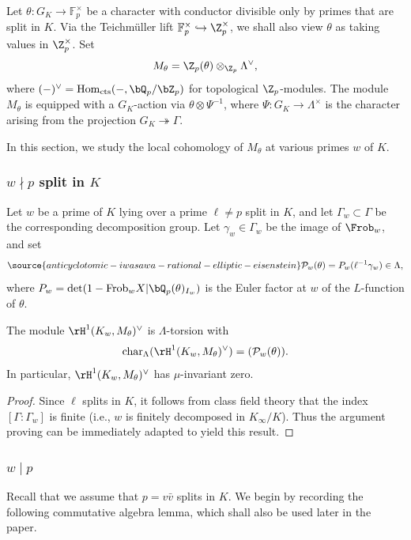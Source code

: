 Let  $\theta:G_K\rightarrow\mathbb{F}_p^\times$
be a character with conductor divisible only by primes that are split in $K$. Via the Teichm\"uller lift $\mathbb{F}_p^\times\hookrightarrow\Z_p^\times$, we shall also view $\theta$ as taking values in $\Z_p^\times$. Set
\[
M_\theta=\Z_p(\theta)\otimes_{\Z_p}\Lambda^\vee,
\]
where $(-)^\vee = {\rm Hom}_{\rm cts}(-,\bQ_p/\bZ_p)$ for topological $\Z_p$-modules. The module $M_\theta$ is equipped with a $G_K$-action via $\theta\otimes\Psi^{-1}$, where $\Psi:G_K\rightarrow\Lambda^\times$ is the character arising from the projection $G_K\twoheadrightarrow\Gamma$.

In this section, we study the local cohomology of $M_\theta$ at various primes $w$ of $K$.

\subsubsection{$w\nmid p$ split in $K$}

Let $w$ be a prime of $K$ lying over a prime $\ell\neq p$ split in $K$, and let $\Gamma_w\subset \Gamma$ be the corresponding decomposition group. Let $\gamma_w\in\Gamma_w$ be
the image of $\Frob_w$, and set
\begin{equation}\label{eq:Euler}
\source{anticyclotomic-iwasawa-rational-elliptic-eisenstein}
\mathcal{P}_w(\theta)=P_w(\ell^{-1}\gamma_w)
\in\Lambda,
\end{equation}
where $P_w={\rm det}(1-{\rm Frob}_wX\vert\bQ_p(\theta)_{I_w})$ is the Euler factor at $w$ of the $L$-function of $\theta$.

\begin{lemma}
\notready\label{lemmawneqp}
The module $\rH^1(K_w,M_\theta)^\vee$ is $\Lambda$-torsion with
\[
{\rm char}_\Lambda(\rH^1(K_w,M_\theta)^\vee)=(\mathcal{P}_w(\theta)).
\]
In particular, $\rH^1(K_w,M_\theta)^\vee$ has $\mu$-invariant zero.
\end{lemma}

\begin{proof}
Since $\ell$ splits in $K$, it follows from class field theory that the index $[\Gamma:\Gamma_w]$ is finite (i.e., $w$ is finitely decomposed in $K_\infty/K$). Thus the argument proving \cite[Prop.~2.4]{greenvats} can be immediately adapted to yield this result.
\end{proof}


\subsubsection{$w\mid p$} Recall that we assume that $p=v\bar{v}$ splits in $K$. We begin by recording the following commutative algebra lemma, which shall also be used later in the paper.

